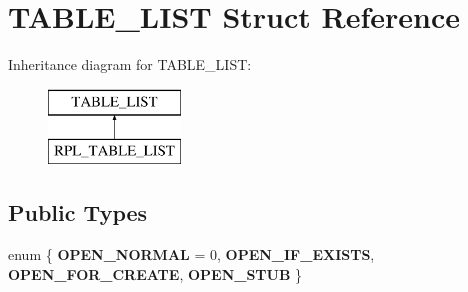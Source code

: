 \hypertarget{structTABLE__LIST}{}\section{T\+A\+B\+L\+E\+\_\+\+L\+I\+ST Struct Reference}
\label{structTABLE__LIST}
Inheritance diagram for T\+A\+B\+L\+E\+\_\+\+L\+I\+ST\+:\begin{figure}[H]
\begin{center}
\leavevmode
\includegraphics[height=2.000000cm]{structTABLE__LIST}
\end{center}
\end{figure}
\subsection*{Public Types}
\begin{DoxyCompactItemize}
\item 
enum \{ {\bfseries O\+P\+E\+N\+\_\+\+N\+O\+R\+M\+AL} = 0, 
{\bfseries O\+P\+E\+N\+\_\+\+I\+F\+\_\+\+E\+X\+I\+S\+TS}, 
{\bfseries O\+P\+E\+N\+\_\+\+F\+O\+R\+\_\+\+C\+R\+E\+A\+TE}, 
{\bfseries O\+P\+E\+N\+\_\+\+S\+T\+UB}
 \}
\end{DoxyCompactItemize}
